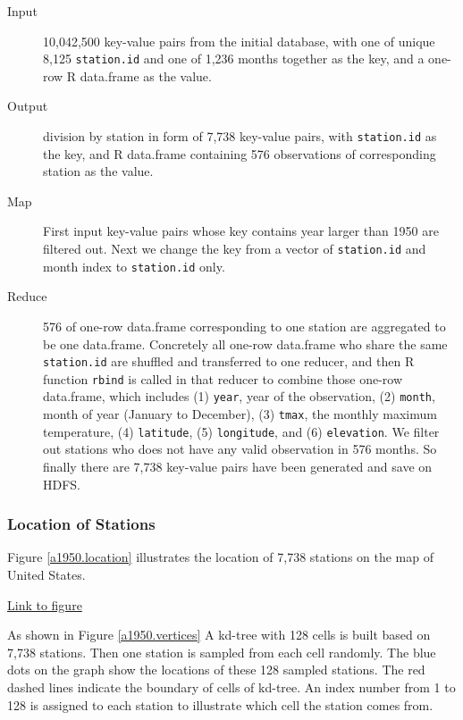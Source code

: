 \begin{description}
  \item[Input] 10,042,500 key-value pairs from the initial database, with one of
  unique 8,125 \texttt{station.id} and one of 1,236 months together as the key, 
  and a one-row R data.frame as the value. 
  \item[Output] division by station in form of 7,738 key-value pairs, with 
  \texttt{station.id} as the key, and R data.frame containing 576 observations 
  of corresponding station as the value.
  \item[Map]First input key-value pairs whose key contains year larger than 1950
  are filtered out. Next we change the key from a vector of \texttt{station.id} 
  and month index to \texttt{station.id} only. 
  \item[Reduce] 576 of one-row data.frame corresponding to one station are 
  aggregated to be one data.frame. Concretely all one-row data.frame who share
  the same \texttt{station.id} are shuffled and transferred to one reducer, and 
  then R function \texttt{rbind} is called in that reducer to combine those one-row 
  data.frame, which includes (1) \texttt{year}, year of the observation, 
  (2) \texttt{month}, month of year (January to December), (3) \texttt{tmax}, 
  the monthly maximum temperature, (4) \texttt{latitude}, (5) \texttt{longitude}, 
  and (6) \texttt{elevation}. We filter out stations who does not have any valid
  observation in 576 months. So finally there are 7,738 key-value pairs have been
  generated and save on HDFS. 
\end{description}

\subsubsection{Location of Stations}

Figure \href{../plots/a1950stations.pdf}{\ref*{a1950.location}} illustrates the 
location of 7,738 stations on the map of United States.

\begin{framed}
\begin{center}
  \href{../plots/a1950stations.pdf}{Link to figure}
  \label{a1950.location}
\end{center}
\end{framed}

As shown in Figure \href{../plots/vertices.a1950.pdf}{\ref*{a1950.vertices}}
A kd-tree with 128 cells is built based on 7,738 stations. Then one station is 
sampled from each cell randomly. The blue dots on the graph show the locations 
of these 128 sampled stations. The red dashed lines indicate the boundary of cells 
of kd-tree. An index number from 1 to 128 is assigned to each station to 
illustrate which cell the station comes from. 


